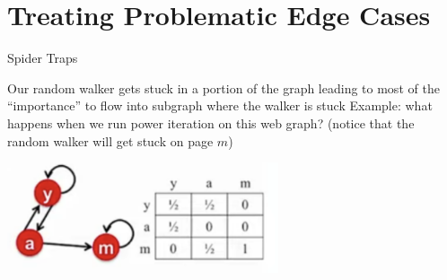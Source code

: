 \documentclass{beamer}
\begin{document}
\section{Treating Problematic Edge Cases}
\begin{frame}[t]{Spider Traps}
\begin{outline}
    \1 Our random walker gets stuck in a portion of the graph leading to most of the “importance” to flow into subgraph where the walker is stuck
    \1 Example: what happens when we run power iteration on this web graph? (notice that the random walker will get stuck on page $m$)
    \begin{center}
        \includegraphics[width=0.6\textwidth]{spider.png}
    \end{center}
\end{outline}
\end{frame}
\end{document}
